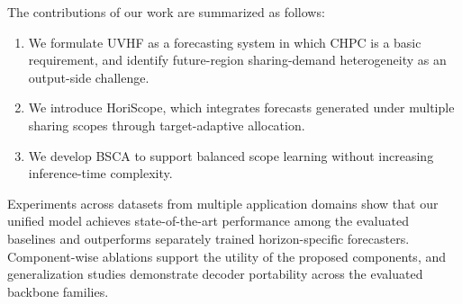 The contributions of our work are summarized as follows:

\begin{enumerate}
\item We formulate UVHF as a forecasting system in which CHPC is a basic requirement, and identify future-region sharing-demand heterogeneity as an output-side challenge.
\item We introduce HoriScope, which integrates forecasts generated under multiple sharing scopes through target-adaptive allocation.
\item We develop BSCA to support balanced scope learning without increasing inference-time complexity.
\end{enumerate}

Experiments across datasets from multiple application domains show that our unified model achieves state-of-the-art performance among the evaluated baselines and outperforms separately trained horizon-specific forecasters. Component-wise ablations support the utility of the proposed components, and generalization studies demonstrate decoder portability across the evaluated backbone families.
